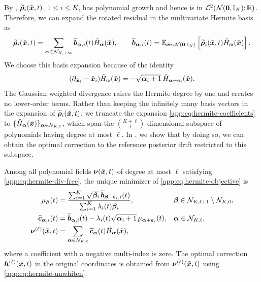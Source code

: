 By , $\widetilde{\boldsymbol{\rho}}_i(\tilde{\boldsymbol{x}},t)$, $1\leq i\leq K$, has polynomial growth and hence is in $\mathcal{L}^2(\mathcal{N}(\boldsymbol{0},\mathbb{I}_K);\mathbb{R})$.
Therefore, we can expand the rotated residual in the multivariate Hermite basis as
\begin{equation}\label{app:eq:hermite-coefficients}
\widetilde{\boldsymbol{\rho}}_i(\tilde{\boldsymbol{x}},t)=\sum_{\boldsymbol{\alpha}\in\mathcal{N}_{K,+\infty}}\widetilde{\boldsymbol{b}}_{\boldsymbol{\alpha},i}(t)\hat{H}_{\boldsymbol{\alpha}}(\tilde{\boldsymbol{x}}), \qquad \widetilde{\boldsymbol{b}}_{\boldsymbol{\alpha},i}(t)=\mathbb{E}_{\tilde{\boldsymbol{x}}\sim\mathcal{N}(\boldsymbol{0},\mathbb{I}_K)}\left[\widetilde{\boldsymbol{\rho}}_i(\tilde{\boldsymbol{x}},t)\hat{H}_{\boldsymbol{\alpha}}(\tilde{\boldsymbol{x}})\right].
\end{equation}
We choose this basis expansion because of the identity
\begin{equation}\label{app:eq:hermite-raising}
(\partial_{\tilde{\boldsymbol{x}}_i}-\tilde{\boldsymbol{x}}_i)\hat{H}_{\boldsymbol{\alpha}}(\tilde{\boldsymbol{x}}) =-\sqrt{\boldsymbol{\alpha}_i+1}\,\hat{H}_{\boldsymbol{\alpha}+\boldsymbol{e}_i}(\tilde{\boldsymbol{x}}).
\end{equation}
The Gaussian weighted divergence raises the Hermite degree by one and creates no lower-order terms.
Rather than keeping the infinitely many basis vectors in the expansion of $\widetilde{\boldsymbol{\rho}}_i(\tilde{\boldsymbol{x}}, t)$, we truncate the expansion \cref{app:eq:hermite-coefficients} to $\{\hat{H}_{\boldsymbol{\alpha}}(\tilde{\boldsymbol{x}})\}_{\boldsymbol{\alpha} \in \mathcal{N}_{K, \ell}}$, which span the $\binom{K + \ell}{\ell}$-dimensional subspace of polynomials having degree at most $\ell$.
In , we show that by doing so, we can obtain the optimal correction to the reference posterior drift restricted to this subspace.
\begin{proposition}\label{app:prop:hermite-projection}
Among all polynomial fields $\boldsymbol{\nu}(\tilde{\boldsymbol{x}}, t)$ of degree at most $\ell$ satisfying \cref{app:eq:hermite-div-free}, the unique minimizer of \cref{app:eq:hermite-objective} is
\begin{equation}\label{app:eq:hermite-solution}
\begin{aligned}
\mu_{\boldsymbol{\beta}}(t)&=\frac{\sum_{i=1}^K\sqrt{\boldsymbol{\beta}_i}\, \widetilde{\boldsymbol{b}}_{\boldsymbol{\beta}-\boldsymbol{e}_i,i}(t)} {\sum_{i=1}^K\lambda_i(t)\boldsymbol{\beta}_i}, &&\boldsymbol{\beta} \in \mathcal{N}_{K, \ell+1} \setminus \mathcal{N}_{K, 0},\\
\widetilde{\boldsymbol{c}}_{\boldsymbol{\alpha},i}(t) &=\widetilde{\boldsymbol{b}}_{\boldsymbol{\alpha},i}(t) -\lambda_i(t)\sqrt{\boldsymbol{\alpha}_i+1}\, \mu_{\boldsymbol{\alpha}+\boldsymbol{e}_i}(t), &&\boldsymbol{\alpha} \in \mathcal{N}_{K, \ell},\\
\boldsymbol{\nu}^{(\ell)}(\tilde{\boldsymbol{x}}, t) &=\sum_{\boldsymbol{\alpha} \in \mathcal{N}_{K, \ell}} \widetilde{\boldsymbol{c}}_{\boldsymbol{\alpha}}(t)\hat{H}_{\boldsymbol{\alpha}}(\tilde{\boldsymbol{x}}),
\end{aligned}
\end{equation}
where a coefficient with a negative multi-index is zero.
The optimal correction $\boldsymbol{h}^{(\ell)}(\boldsymbol{x}, t)$ in the original coordinates is obtained from $\boldsymbol{\nu}^{(\ell)}(\tilde{\boldsymbol{x}}, t)$ using \cref{app:eq:hermite-unwhiten}.
\end{proposition}

